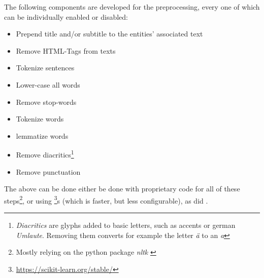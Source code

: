 The following components are developed for the preprocessing, every one of which can be individually enabled or disabled:
\begin{itemize}
	\item Prepend title and/or subtitle to the entities' associated text 
	\item Remove HTML-Tags from texts 
	\item Tokenize sentences 
	\item Lower-case all words
	\item Remove stop-words
	\item Tokenize words
	\item \Gls{lemma}tize words
	\item Remove diacritics\footnote{\emph{Diacritics} are glyphs added to basic letters, such as accents or german \emph{Umlaute}. Removing them converts for example the letter \emph{ä} to an \emph{a}}
	\item Remove punctuation 
\end{itemize}

The above can be done either be done with proprietary code for all of these steps\footnote{Mostly relying on the python package \emph{nltk} \cite{bird2009natural}}, or using \footnote{\url{https://scikit-learn.org/stable/}}s  (which is faster, but less configurable), as did \cite{Ager2018}.





